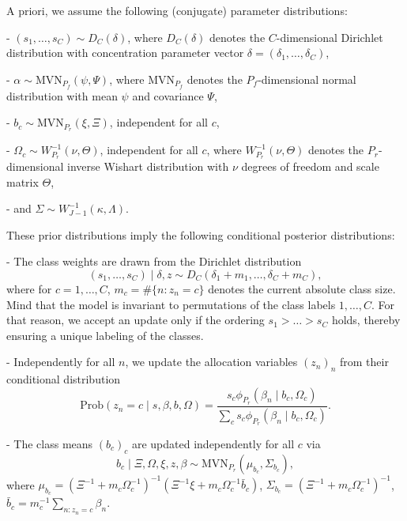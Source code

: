 \documentclass[article]{jss}
\begin{document}
A priori, we assume the following (conjugate) parameter distributions:

- $(s_1,\dots,s_C)\sim D_C(\delta)$, where $D_C(\delta)$ denotes the $C$-dimensional Dirichlet distribution with concentration parameter vector $\delta = (\delta_1,\dots,\delta_C)$,

- $\alpha\sim \text{MVN}_{P_f}(\psi,\Psi)$, where $\text{MVN}_{P_f}$ denotes the $P_f$-dimensional normal distribution with mean $\psi$ and covariance $\Psi$,

- $b_c \sim \text{MVN}_{P_r}(\xi,\Xi)$, independent for all $c$,

- $\Omega_c \sim W^{-1}_{P_r}(\nu,\Theta)$, independent for all $c$, where $W^{-1}_{P_r}(\nu,\Theta)$ denotes the $P_r$-dimensional inverse Wishart distribution with $\nu$ degrees of freedom and scale matrix $\Theta$,

- and $\Sigma \sim W^{-1}_{J-1}(\kappa,\Lambda)$.

These prior distributions imply the following conditional posterior distributions:

- The class weights are drawn from the Dirichlet distribution
\begin{equation}
(s_1,\dots,s_C)\mid \delta,z \sim D_C(\delta_1+m_1,\dots,\delta_C+m_C),
\end{equation}
where for $c=1,\dots,C$, $m_c=\#\{n:z_n=c\}$ denotes the current absolute class size. Mind that the model is invariant to permutations of the class labels $1,\dots,C$. For that reason, we accept an update only if the ordering $s_1>\dots>s_C$ holds, thereby ensuring a unique labeling of the classes.

- Independently for all $n$, we update the allocation variables $(z_n)_n$ from their conditional distribution
\begin{equation}
\text{Prob}(z_n=c\mid s,\beta,b,\Omega )=\frac{s_c\phi_{P_r}(\beta_n\mid b_c,\Omega_c)}{\sum_c s_c\phi_{P_r}(\beta_n\mid b_c,\Omega_c)}.
\end{equation}

- The class means $(b_c)_c$ are updated independently for all $c$ via
\begin{equation}
b_c\mid \Xi,\Omega,\xi,z,\beta \sim\text{MVN}_{P_r}\left( \mu_{b_c}, \Sigma_{b_c}  \right),
\end{equation}
where $\mu_{b_c}=(\Xi^{-1}+m_c\Omega_c^{-1})^{-1}(\Xi^{-1}\xi +m_c\Omega_c^{-1}\bar{b}_c)$, $\Sigma_{b_c}=(\Xi^{-1}+m_c\Omega_c^{-1})^{-1}$, $\bar{b}_c=m_c^{-1}\sum_{n:z_n=c} \beta_n$.
\end{document}
